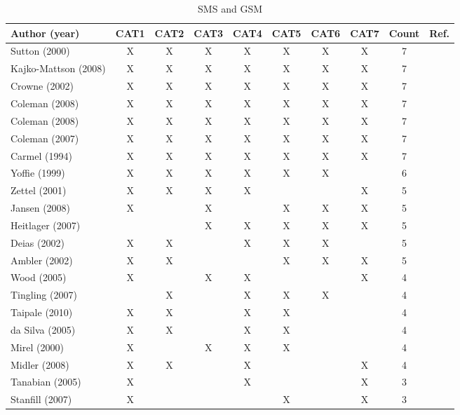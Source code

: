 \documentclass[10pt,journal,letterpaper,compsoc]{IEEEtran}
\begin{document}
\begin{table}[!t]
\renewcommand{\arraystretch}{1.3}
\caption{SMS \cite{SMS} and GSM}
\label{tab:an:literature_comp}
\centering
\begin{tabular}{|l||c||c||c||c||c||c||c||c||c|}

\hline
Author (year) & CAT1 & CAT2 & CAT3 & CAT4 & CAT5 & CAT6 & CAT7 & Count & Ref. \\
\hline
Sutton (2000) & X & X & X & X & X & X & X & 7 & \cite{Sutton2000} \\
Kajko-Mattson (2008) & X & X & X & X & X & X & X & 7 &
\cite{Kajko-Mattsson2008} \\
Crowne (2002) & X & X & X & X & X & X & X & 7 & \cite{Crowne2002} \\
Coleman (2008) & X & X & X & X & X & X & X & 7 & \cite{Coleman2008a} \\
Coleman (2008) & X & X & X & X & X & X & X & 7 & \cite{Coleman2008} \\
Coleman (2007) & X & X & X & X & X & X & X & 7 & \cite{Coleman2007} \\
Carmel (1994) & X & X & X & X & X & X & X & 7 & \cite{Camel1994a} \\
Yoffie (1999) & X & X & X & X & X & X & & 6 & \cite{Yoffie1999} \\
Zettel (2001) & X & X & X & X & & & X & 5 & \cite{Zettel2001} \\
Jansen (2008) & X & & X & & X & X & X & 5 & \cite{Jansen2008} \\
Heitlager (2007) & & & X & X & X & X & X & 5 & \cite{Heitlager2007} \\
Deias (2002) & X & X & & X & X & X & & 5 & \cite{Deias} \\
Ambler (2002) & X & X & & & X & X & X & 5 & \cite{Ambler2002} \\
Wood (2005) & X & & X & X & & & X & 4 & \cite{Wood2005} \\
Tingling (2007) & & X & & X & X & X & & 4 & \cite{Tingling2007} \\
Taipale (2010) & X & X & & X & X & & & 4 & \cite{Taipale2010} \\
da Silva (2005) & X & X & & X & X & & & 4 & \cite{Silva2005} \\
Mirel (2000) & X & & X & X & X & & & 4 & \cite{Mirel2000} \\
Midler (2008) & X & X & & X & & & X & 4 & \cite{Midler2008} \\
Tanabian (2005) & X & & & X & & & X & 3 & \cite{Tanabian2005} \\
Stanfill (2007) & X & & & & X & & X & 3 & \cite{Stanfill2007} \\

\end{tabular}
\end{table}
\end{document}
